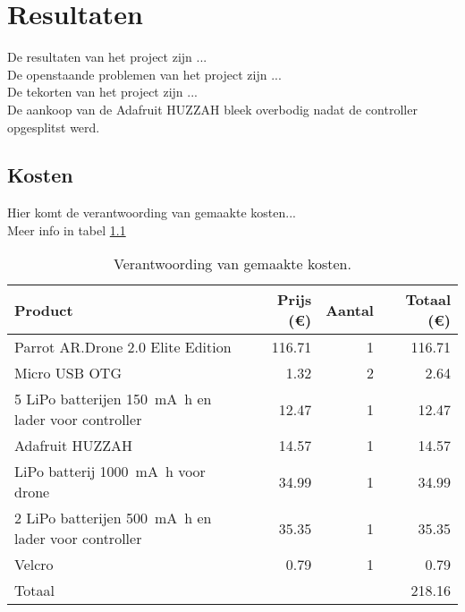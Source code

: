 \chapter{Resultaten}
De resultaten van het project zijn ...\\

De openstaande problemen van het project zijn ...\\

De tekorten van het project zijn ...\\

De aankoop van de Adafruit HUZZAH bleek overbodig nadat de controller opgesplitst werd.

\section{Kosten}
Hier komt de verantwoording van gemaakte kosten...\\

Meer info in tabel \ref{tab:kosten}
\begin{table}[p]
\centering
\begin{tabular}{ |l|r|r|r| } \hline
Product & Prijs (\euro{}) & Aantal & Totaal (\euro{}) \\ [.5ex] \hline \hline
Parrot AR.Drone 2.0 Elite Edition & 116.71 & 1 & 116.71 \\ \hline
Micro USB OTG & 1.32 & 2 & 2.64 \\ \hline
5 LiPo batterijen \SI{150}{\mA\hour} en lader voor controller & 12.47 & 1 & 12.47 \\ \hline
Adafruit HUZZAH & 14.57 & 1 & 14.57 \\ \hline
LiPo batterij \SI{1000}{\mA\hour} voor drone & 34.99 & 1 & 34.99 \\ \hline
2 LiPo batterijen \SI{500}{\mA\hour} en lader voor controller & 35.35 & 1 & 35.35 \\ [.5ex] \hline
Velcro & 0.79 & 1 & 0.79 \\ \hline
\hline
Totaal & & & 218.16 \\ \hline
\end{tabular}
\caption[Kosten]{Verantwoording van gemaakte kosten.}
\label{tab:kosten}
\end{table}